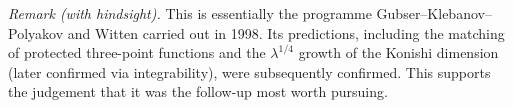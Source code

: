 \documentclass[11pt,a4paper]{article}
\begin{document}
\emph{Remark (with hindsight).} This is essentially the programme Gubser--Klebanov--Polyakov and Witten carried out in 1998. Its predictions, including the matching of protected three-point functions and the $\lambda^{1/4}$ growth of the Konishi dimension (later confirmed via integrability), were subsequently confirmed. This supports the judgement that it was the follow-up most worth pursuing.
\end{document}

